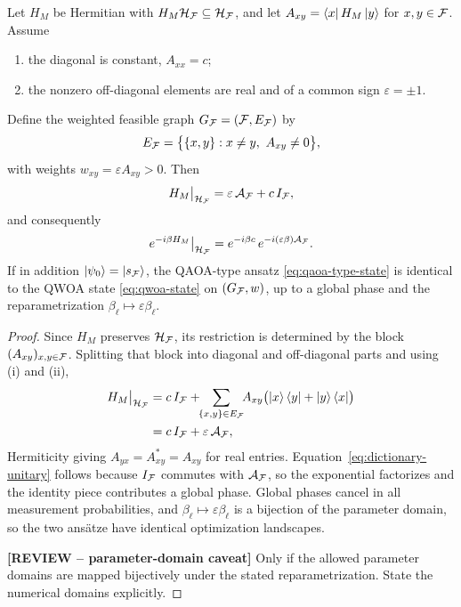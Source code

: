 \begin{lemma}
\label{lem:dictionary}
Let $H_M$ be Hermitian with $H_M\mathcal{H}_{\mathcal{F}}\subseteq\mathcal{H}_{\mathcal{F}}$, and let $A_{xy}=\bra{x}H_M\ket{y}$ for $x,y\in\mathcal{F}$. Assume
\begin{enumerate}
    \item[(i)] the diagonal is constant, $A_{xx}=c$;
    \item[(ii)] the nonzero off-diagonal elements are real and of a common sign
$\varepsilon=\pm1$.
\end{enumerate}
Define the weighted feasible graph $G_{\mathcal{F}}=(\mathcal{F},E_{\mathcal{F}})$ by
\begin{equation}
E_{\mathcal{F}}=\bigl\{\{x,y\}:x\neq y,\ A_{xy}\neq 0\bigr\},
    \label{eq:dictionary-graph}
\end{equation}
with weights $w_{xy}=\varepsilon A_{xy}>0$. Then
\begin{equation}
H_M\big|_{\mathcal{H}_{\mathcal{F}}} = \varepsilon\,\mathcal{A}_{\mathcal{F}}+c\,I_{\mathcal{F}},
    \label{eq:dictionary-operator}
\end{equation}
and consequently
\begin{equation}
e^{-i\beta H_M}\big|_{\mathcal{H}_{\mathcal{F}}} = e^{-i\beta c}\, e^{-i(\varepsilon\beta)\mathcal{A}_{\mathcal{F}}} .
    \label{eq:dictionary-unitary}
\end{equation}
If in addition $\ket{\psi_0}=\ket{s_{\mathcal{F}}}$, the QAOA-type ansatz \eqref{eq:qaoa-type-state} is identical to the QWOA state \eqref{eq:qwoa-state} on $(G_{\mathcal{F}},w)$, up to a global phase and the reparametrization $\beta_\ell\mapsto\varepsilon\beta_\ell$.
\end{lemma}

\begin{proof}
Since $H_M$ preserves $\mathcal{H}_{\mathcal{F}}$, its restriction is determined by the block $(A_{xy})_{x,y\in\mathcal{F}}$. Splitting that block into diagonal and off-diagonal parts and using (i) and (ii),
\begin{align}
H_M\big|_{\mathcal{H}_{\mathcal{F}}}
    &=
c\,I_{\mathcal{F}} + \!\!\sum_{\{x,y\}\in E_{\mathcal{F}}}\!\! A_{xy}\bigl(\ket{x}\bra{y}+\ket{y}\bra{x}\bigr)
    \nonumber\\
    &=
c\,I_{\mathcal{F}}+\varepsilon\,\mathcal{A}_{\mathcal{F}},
\end{align}
Hermiticity giving $A_{yx}=A_{xy}^{*}=A_{xy}$ for real entries. Equation~\eqref{eq:dictionary-unitary} follows because $I_{\mathcal{F}}$ commutes with $\mathcal{A}_{\mathcal{F}}$, so the exponential factorizes and the identity piece contributes a global phase. Global phases cancel in all measurement probabilities, and $\beta_\ell\mapsto\varepsilon\beta_\ell$ is a bijection of the parameter domain, so the two ans\"atze have identical optimization landscapes.

{\color{red}\textbf{[REVIEW -- parameter-domain caveat]} Only if the allowed parameter domains are mapped bijectively under the stated reparametrization. State the numerical domains explicitly.}
\end{proof}

